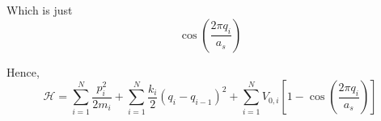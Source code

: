 Which is just
\[ \cos \left( \frac{2\pi q_{i}}{a_{s}}\right) \]

Hence, 
\[ 
\mathcal{H} = \sum_{i=1}^{N}\frac{p_{i}^{2}}{2m_i} + 
\sum_{i=1}^{N} \frac{k_i}{2}(q_{i} - q_{i-1})^{2} +
\sum_{i=1}^{N} V_{0,i}\left[1 - 
\cos \left( \frac{2\pi q_{i}}{a_{s}}\right)\right]
\]
%
%
%
%
%
%
%
%
%
